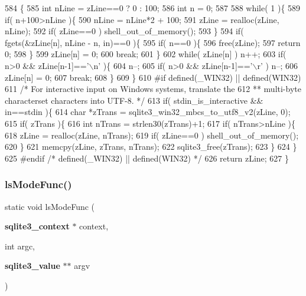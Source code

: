 \begin{DoxyCode}
584                                                  \{
585   \textcolor{keywordtype}{int} nLine = zLine==0 ? 0 : 100;
586   \textcolor{keywordtype}{int} n = 0;
587 
588   \textcolor{keywordflow}{while}( 1 )\{
589     \textcolor{keywordflow}{if}( n+100>nLine )\{
590       nLine = nLine*2 + 100;
591       zLine = realloc(zLine, nLine);
592       \textcolor{keywordflow}{if}( zLine==0 ) shell_out_of_memory();
593     \}
594     \textcolor{keywordflow}{if}( fgets(&zLine[n], nLine - n, in)==0 )\{
595       \textcolor{keywordflow}{if}( n==0 )\{
596         free(zLine);
597         \textcolor{keywordflow}{return} 0;
598       \}
599       zLine[n] = 0;
600       \textcolor{keywordflow}{break};
601     \}
602     \textcolor{keywordflow}{while}( zLine[n] ) n++;
603     \textcolor{keywordflow}{if}( n>0 && zLine[n-1]==\textcolor{charliteral}{'\(\backslash\)n'} )\{
604       n--;
605       \textcolor{keywordflow}{if}( n>0 && zLine[n-1]==\textcolor{charliteral}{'\(\backslash\)r'} ) n--;
606       zLine[n] = 0;
607       \textcolor{keywordflow}{break};
608     \}
609   \}
610 \textcolor{preprocessor}{#if defined(\_WIN32) || defined(WIN32)}
611   \textcolor{comment}{/* For interactive input on Windows systems, translate the}
612 \textcolor{comment}{  ** multi-byte characterset characters into UTF-8. */}
613   \textcolor{keywordflow}{if}( stdin_is_interactive && in==stdin )\{
614     \textcolor{keywordtype}{char} *zTrans = sqlite3\_win32\_mbcs\_to\_utf8\_v2(zLine, 0);
615     \textcolor{keywordflow}{if}( zTrans )\{
616       \textcolor{keywordtype}{int} nTrans = strlen30(zTrans)+1;
617       \textcolor{keywordflow}{if}( nTrans>nLine )\{
618         zLine = realloc(zLine, nTrans);
619         \textcolor{keywordflow}{if}( zLine==0 ) shell_out_of_memory();
620       \}
621       memcpy(zLine, zTrans, nTrans);
622       sqlite3_free(zTrans);
623     \}
624   \}
625 \textcolor{preprocessor}{#endif }\textcolor{comment}{/* defined(\_WIN32) || defined(WIN32) */}\textcolor{preprocessor}{}
626   \textcolor{keywordflow}{return} zLine;
627 \}
\end{DoxyCode}
\mbox{\label{shell_8c_a6f313b008c50dbdd10869b61bc4a1cc7}} 
\subsubsection{ls\+Mode\+Func()}
{\footnotesize\ttfamily static void ls\+Mode\+Func (\begin{DoxyParamCaption}\item[{\textbf{ sqlite3\+\_\+context} $\ast$}]{context,  }\item[{int}]{argc,  }\item[{\textbf{ sqlite3\+\_\+value} $\ast$$\ast$}]{argv }\end{DoxyParamCaption})\hspace{0.3cm}{\ttfamily [static]}}



